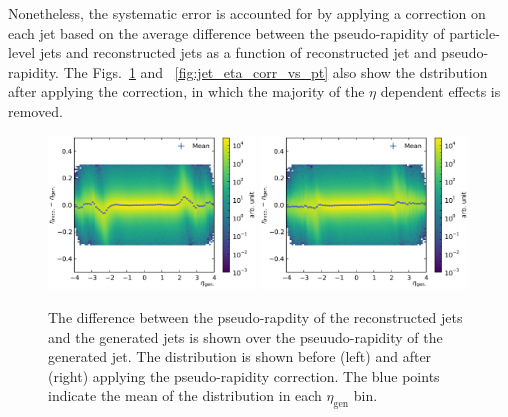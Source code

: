 Nonetheless, the systematic error is accounted for by applying a correction on
each jet based on the average difference between the pseudo-rapidity of
particle-level jets and reconstructed jets as a function of reconstructed jet
\pt and pseudo-rapidity. The Figs.~\ref{fig:jet_eta_corr} and
~\ref{fig:jet_eta_corr_vs_pt} also show the dstribution after applying the
correction, in which the majority of the $\eta$ dependent effects is removed.

\begin{figure}[htbp]
    \centering
    \includegraphics[width=0.49\textwidth]{figures/measurement/genvsreco_eta.pdf}\hfill
    \includegraphics[width=0.49\textwidth]{figures/measurement/genvsreco_eta_corr.pdf}
    \caption[Differences of pseudo-rapidity of reconstructed jets to
        generator-level jets]{The difference between the pseudo-rapdity of the
            reconstructed jets and the generated jets is shown over the
            pseuudo-rapidity of the generated jet. The distribution is shown
            before (left) and after (right) applying the pseudo-rapidity
            correction. The blue points indicate the mean of the distribution in
            each $\eta_{\mathrm{gen}}$ bin.}
    \label{fig:jet_eta_corr}
\end{figure}


